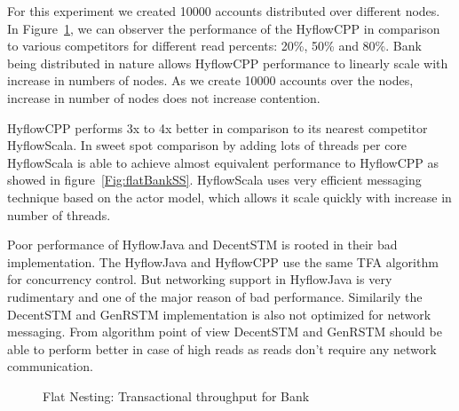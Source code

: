 \documentclass[12pt,english]{report}
\begin{document}
For this experiment we created 10000 accounts distributed over different nodes. In Figure~\ref{Fig:flatBank}, we can observer the performance of the HyflowCPP in comparison to various competitors for different read percents: 20\%, 50\% and 80\%. Bank being distributed in nature allows HyflowCPP performance to linearly scale with increase in numbers of nodes. As we create 10000 accounts over the nodes, increase in number of nodes does not increase contention.

HyflowCPP performs 3x to 4x better in comparison to its nearest competitor HyflowScala. In sweet spot comparison by adding lots of threads per core HyflowScala is able to achieve almost equivalent performance to HyflowCPP as showed in figure~\ref{Fig:flatBankSS}. HyflowScala uses very efficient messaging technique based on the actor model, which allows it scale quickly with increase in number of threads.

Poor performance of HyflowJava and  DecentSTM is rooted in their bad implementation. The HyflowJava and HyflowCPP use the same TFA algorithm for concurrency control. But networking support in HyflowJava is very rudimentary and one of the major reason of bad performance. Similarily the DecentSTM and GenRSTM implementation is also not optimized for network messaging. From algorithm point of view DecentSTM and GenRSTM should be able to perform better in case of high reads as reads don't require any network communication.

\begin{figure}
\centering
{}
\end{figure}
\begin{figure}[H]
\centering
{}
\end{figure}
\begin{figure}[H]
\centering
{}
\end{figure}
\begin{figure}[H]
\centering
{}
\caption{Flat Nesting: Transactional throughput for Bank}
\label{Fig:flatBank}
\end{figure}
\end{document}
